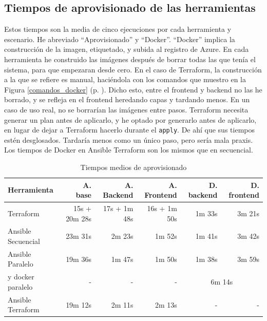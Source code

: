 \documentclass[11pt]{article}
\begin{document}
\begin{flushleft}
\section{Tiempos de aprovisionado de las herramientas}
\label{anexo:tiempos}
Estos tiempos son la media de cinco ejecuciones por cada herramienta y escenario. He abreviado ``Aprovisionado'' y ``Docker''. ``Docker'' implica la construcción de la imagen, etiquetado, y subida al registro de Azure. En cada herramienta he construido las imágenes después de borrar todas las que tenía el sistema, para que empezaran desde cero. En el caso de Terraform, la construcción a la que se refiere es manual, haciéndola con los comandos que muestro en la Figura \ref{comandos_docker} (p. \pageref{comandos_docker}). Dicho esto, entre el frontend y backend no las he borrado, y se refleja en el frontend heredando capas y tardando menos. En un caso de uso real, no se borrarían las imágenes entre pasos. Terraform necesita generar un plan antes de aplicarlo, y he optado por generarlo antes de aplicarlo, en lugar de dejar a Terraform hacerlo durante el \texttt{apply}. De ahí que sus tiempos estén desglosados. Tardaría menos como un único paso, pero sería mala praxis. Los tiempos de Docker en Ansible Terraform son los mismos que en secuencial.
\linebreak

\setcounter{table}{0}
\begin{table}[h!]
    \centering
    \begin{tabular}{| l | r | r | r | r | r |}
        \hline
        \textbf{Herramienta} & \textbf{A. base} & \textbf{A. Backend}      & \textbf{A. Frontend}    & \textbf{D. backend} & \textbf{D. frontend} \\
        \hline
        \hline
        Terraform            & 15s + 20m 28s    & 17s + 1m 48s             & 16s + 1m 50s            & 1m 33s              & 3m 21s               \\
        \hline
        Ansible Secuencial   & 23m 31s          & 2m 23s                   & 1m 52s                  & 1m 41s              & 3m 42s               \\
        \hline
        Ansible Paralelo     & 19m 36s          & 1m 47s                   & 1m 50s                  & 1m 38s              & 3m 59s               \\
        \hline
        y docker paralelo    & -                & -                        & -                       & \multicolumn{2}{c|}{6m 14s}                \\
        \hline
        Ansible Terraform    & 19m 12s          & 2m 11s                   & 2m 13s                  & -                   & -                    \\
        \hline
    \end{tabular}
    \caption{Tiempos medios de aprovisionado}
    \label{tiempo_aprovisionar}
\end{table}







\end{flushleft}
\end{document}
